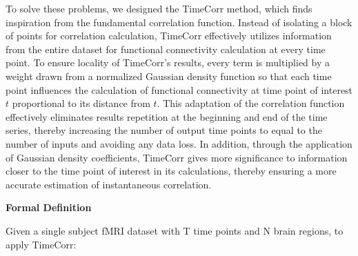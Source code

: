 \documentclass[11pt]{article}
\begin{document}
To solve these problems, we designed the TimeCorr method, which finds inspiration from the fundamental correlation function. Instead of isolating a block of points for correlation calculation, TimeCorr effectively utilizes information from the entire dataset for functional connectivity calculation at every time point. To ensure locality of TimeCorr's results, every term is multiplied by a weight drawn from a normalized Gaussian density function so that each time point influences the calculation of functional connectivity at time point of interest $t$ proportional to its distance from $t$. This adaptation of the correlation function effectively eliminates results repetition at the beginning and end of the time series, thereby increasing the number of output time points to equal to the number of inputs and avoiding any data loss. In addition, through the application of Gaussian density coefficients, TimeCorr gives more significance to information closer to the time point of interest in its calculations, thereby ensuring a more accurate estimation of instantaneous correlation.

\large{\textbf{Formal Definition}}

\normalsize
Given a single subject fMRI dataset with T time points and N brain regions, to apply TimeCorr:
\end{document}
